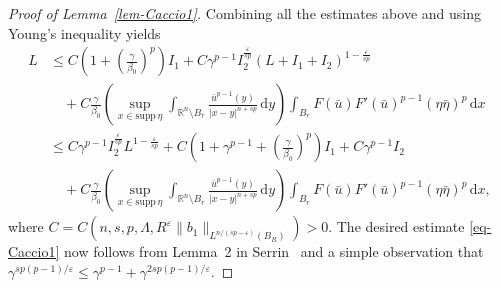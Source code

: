 \documentclass[11pt]{amsart}
\theoremstyle{plain}
\theoremstyle{definition}
\numberwithin{equation}{section}
\begin{document}
\begin{proof}[Proof of Lemma~\ref{lem-Caccio1}]
Combining all the estimates above and using Young's inequality yields
\begin{equation}\label{eq-Young}
\begin{split}
L
&\leq C \left( 1+\left( \frac{\gamma}{\beta_0} \right)^p \right) I_1 + C\gamma^{p-1} I_2^{\frac{\varepsilon}{sp}} (L+I_1+I_2)^{1-\frac{\varepsilon}{sp}} \\
&\quad + C \frac{\gamma}{\beta_0} \left( \sup_{x \in \mathrm{supp} \, \eta} \int_{\mathbb{R}^n \setminus B_r} \frac{\bar{u}^{p-1}(y)}{|x-y|^{n+sp}} \,\mathrm{d}y \right) \int_{B_r} F(\bar{u}) F'(\bar{u})^{p-1} (\eta\bar{\eta})^p \,\mathrm{d}x \\
&\leq C\gamma^{p-1} I_2^{\frac{\varepsilon}{sp}} L^{1-\frac{\varepsilon}{sp}} + C \left( 1+\gamma^{p-1}+\left( \frac{\gamma}{\beta_0} \right)^p \right) I_1 + C\gamma^{p-1} I_2 \\
&\quad + C \frac{\gamma}{\beta_0} \left( \sup_{x \in \mathrm{supp} \, \eta} \int_{\mathbb{R}^n \setminus B_r} \frac{\bar{u}^{p-1}(y)}{|x-y|^{n+sp}} \,\mathrm{d}y \right) \int_{B_r} F(\bar{u}) F'(\bar{u})^{p-1} (\eta\bar{\eta})^p \,\mathrm{d}x,
\end{split}
\end{equation}
where $C=C(n,s,p,\Lambda, R^{\varepsilon} \|b_1\|_{L^{n/(sp-\varepsilon)}(B_R)})>0$. The desired estimate \eqref{eq-Caccio1} now follows from Lemma~2 in Serrin~\cite{Ser64} and a simple observation that $\gamma^{sp(p-1)/\varepsilon} \leq \gamma^{p-1}+\gamma^{2sp(p-1)/\varepsilon}$.


\end{proof}
\end{document}
